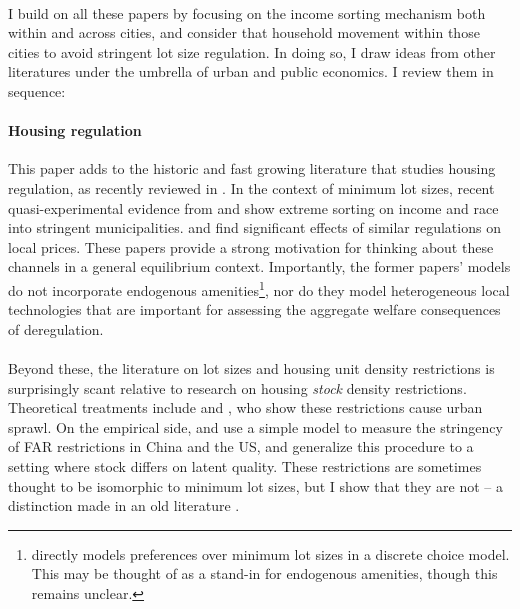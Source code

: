 \documentclass[]{article}
\begin{document}
\paragraph*{}
I build on all these papers by focusing on the income sorting mechanism both within and across cities, and consider that household movement within those cities to avoid stringent lot size regulation. In doing so, I draw ideas from other literatures under the umbrella of urban and public economics. I review them in sequence:

\paragraph*{Housing regulation} This paper adds to the historic and fast growing literature that studies housing regulation, as recently reviewed in \cite{gyourkomolloy}. In the context of minimum lot sizes, recent quasi-experimental evidence from \cite{Song} and \cite{kulka} show extreme sorting on income and race into stringent municipalities. \cite{KSC} and \cite{zabel} find significant effects of similar regulations on local prices. These papers provide a strong motivation for thinking about these channels in a general equilibrium context. Importantly, the former papers' models do not incorporate endogenous amenities\footnote{\cite{Song} directly models preferences over minimum lot sizes in a discrete choice model. This may be thought of as a stand-in for endogenous amenities, though this remains unclear.}, nor do they model heterogeneous local technologies that are important for assessing the aggregate welfare consequences of deregulation.
\paragraph*{}
Beyond these, the literature on lot sizes and housing unit density restrictions is surprisingly scant relative to research on housing \textit{stock} density restrictions. Theoretical treatments include \cite{bbheight} and \cite{mills2005}, who show these restrictions cause urban sprawl. On the empirical side, \cite{BruecknerFuGu} and \cite{bruecknersingh} use a simple model to measure the stringency of FAR restrictions in China and the US, and \cite{TAN2020} generalize this procedure to a setting where stock differs on latent quality. These restrictions are sometimes thought to be isomorphic to minimum lot sizes, but I show that they are not --  a distinction made in an old literature \citep{griesonwhite}.
\end{document}
